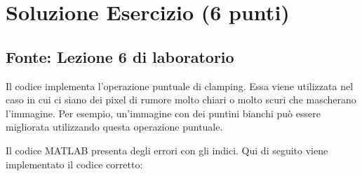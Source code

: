\documentclass[a4paper]{article}
\begin{document}
	\section{Soluzione Esercizio (6 punti)}
	\subsection*{Fonte: Lezione 6 di laboratorio}
	
	Il codice implementa l'operazione puntuale di clamping. Essa viene utilizzata nel caso in cui ci siano dei pixel di rumore molto chiari o molto scuri che mascherano l'immagine. Per esempio, un'immagine con dei puntini bianchi può essere migliorata utilizzando questa operazione puntuale.\newline
	
	\noindent
	Il codice MATLAB presenta degli errori con gli indici. Qui di seguito viene implementato il codice corretto:
	
\end{document}
